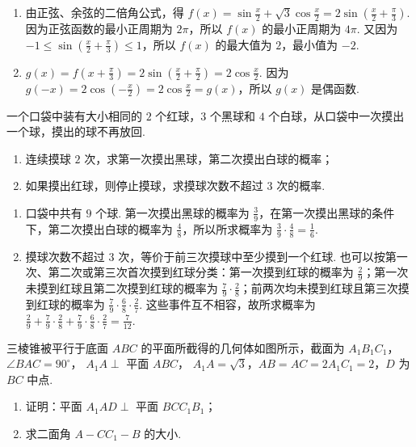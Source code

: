 \begin{solution}
\begin{enumerate}
\item 由正弦、余弦的二倍角公式，得 \(f(x)=\sin\frac{x}{2}+\sqrt{3}\cos\frac{x}{2}=2\sin\left(\frac{x}{2}+\frac{\pi}{3}\right)\). 因为正弦函数的最小正周期为 \(2\pi\)，所以 \(f(x)\) 的最小正周期为 \(4\pi\). 又因为 \(-1\leqslant\sin\left(\frac{x}{2}+\frac{\pi}{3}\right)\leqslant1\)，所以 \(f(x)\) 的最大值为 \(2\)，最小值为 \(-2\).
\item \(g(x)=f\left(x+\frac{\pi}{3}\right)=2\sin\left(\frac{x}{2}+\frac{\pi}{2}\right)=2\cos\frac{x}{2}\). 因为 \(g(-x)=2\cos\left(-\frac{x}{2}\right)=2\cos\frac{x}{2}=g(x)\)，所以 \(g(x)\) 是偶函数.
\end{enumerate}
\end{solution}

\begin{problem}
一个口袋中装有大小相同的 \(2\) 个红球，\(3\) 个黑球和 \(4\) 个白球，从口袋中一次摸出一个球，摸出的球不再放回. 
\begin{enumerate}
\item 连续摸球 \(2\) 次，求第一次摸出黑球，第二次摸出白球的概率；
\item 如果摸出红球，则停止摸球，求摸球次数不超过 \(3\) 次的概率.
\end{enumerate}
\end{problem}

\begin{solution}
\begin{enumerate}
\item 口袋中共有 \(9\) 个球. 第一次摸出黑球的概率为 \(\frac{3}{9}\)，在第一次摸出黑球的条件下，第二次摸出白球的概率为 \(\frac{4}{8}\)，所以所求概率为 \(\frac{3}{9}\cdot\frac{4}{8}=\frac{1}{6}\).
\item 摸球次数不超过 \(3\) 次，等价于前三次摸球中至少摸到一个红球. 也可以按第一次、第二次或第三次首次摸到红球分类：第一次摸到红球的概率为 \(\frac{2}{9}\)；第一次未摸到红球且第二次摸到红球的概率为 \(\frac{7}{9}\cdot\frac{2}{8}\)；前两次均未摸到红球且第三次摸到红球的概率为 \(\frac{7}{9}\cdot\frac{6}{8}\cdot\frac{2}{7}\). 这些事件互不相容，故所求概率为 \(\frac{2}{9}+\frac{7}{9}\cdot\frac{2}{8}+\frac{7}{9}\cdot\frac{6}{8}\cdot\frac{2}{7}=\frac{7}{12}\).
\end{enumerate}
\end{solution}

\begin{problem}
三棱锥被平行于底面 \(ABC\) 的平面所截得的几何体如图所示，截面为 \(A_{1}B_{1}C_{1}\)， \( \angle BAC = 90^{\circ} \)， \( A_{1}A \perp \) 平面 \(ABC\)， \( A_{1}A = \sqrt{3} \)，\(AB = AC = 2A_{1}C_{1} = 2\)，\(D\) 为 \(BC\) 中点.

\begin{enumerate}
\item 证明：平面 \( A_{1}AD \perp \) 平面 \(BCC_{1}B_{1}\)；
\item 求二面角 \(A - CC_{1} - B\) 的大小.
\end{enumerate}

\end{problem}

